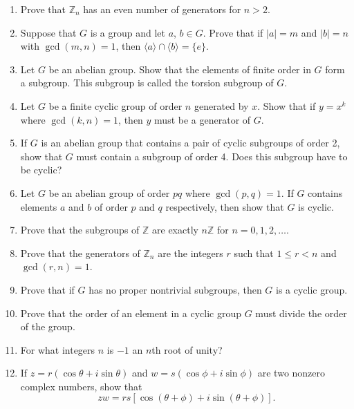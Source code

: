 {\begin{enumerate}
 
\bf\item\rm
Prove that ${\mathbb Z}_n$ has an even number of generators for $n>2$. 
 
 
\bf\item\rm
Suppose that $G$ is a group and let $a$, $b \in G$. Prove that if $|a|
= m$ and $|b| = n$ with $\gcd(m,n) = 1$, then $\langle a \rangle  \cap
\langle b \rangle  = \{ e \}$. 
 
 
\bf\item\rm
Let $G$ be an abelian group. Show that the elements of finite order in
$G$ form a subgroup. This subgroup is called the {\bfi torsion
subgroup} of $G$. 
 
 
\bf\item\rm
Let $G$ be a finite cyclic group of order $n$ generated by $x$. Show
that if $y = x^k$ where $\gcd(k,n) = 1$, then $y$ must be a generator
of $G$.
 
 
\bf\item\rm
If $G$ is an abelian group that contains a pair of cyclic subgroups of
order 2, show that $G$ must contain a subgroup of order 4. Does this
subgroup have to be cyclic?
 
 
\bf\item\rm
Let $G$ be an abelian group of order $pq$ where $\gcd(p,q) = 1$.  If
$G$ contains elements $a$ and $b$ of order $p$ and $q$ respectively,
then show that $G$ is cyclic. 
 
 
\bf\item\rm
Prove that the subgroups of ${\mathbb Z}$ are exactly $n{\mathbb Z}$ for $n
= 0, 1, 2, \ldots$. 
 
 
\bf\item\rm
Prove that the generators of ${\mathbb Z}_n$ are the integers $r$ such
that $1 \leq r < n$ and $\gcd(r,n) =  1$. 
 
 
\bf\item\rm
Prove that if $G$ has no proper nontrivial subgroups, then $G$ is a 
cyclic group.
 
 
 
\bf\item\rm
Prove that the order of an element in a cyclic group $G$ must divide
the order of the  group. 
 
 
\bf\item\rm
For what integers $n$ is $-1$ an $n$th root of unity?
 
 
\bf\item\rm
If $z = r( \cos \theta + i \sin \theta)$ and $w = s(\cos \phi + i \sin
\phi)$ are two nonzero complex numbers, show that
$$
zw = rs[ \cos( \theta + \phi)  + i \sin( \theta + \phi)].
$$
 

\end{enumerate}}
